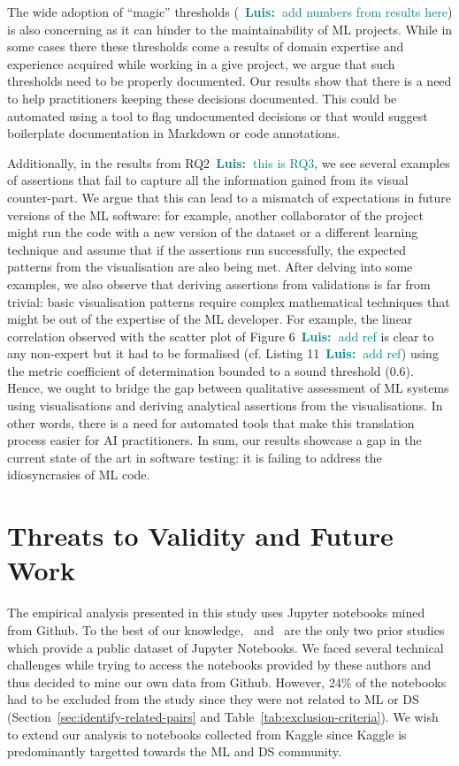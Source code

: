 \documentclass[conference]{IEEEtran}
\newcommand{\luis}[1]{\textcolor{teal}{\ding{46}~\textbf{Luis:~}#1}}
\begin{document}
The wide adoption of ``magic'' thresholds (\luis{add numbers from results here}) is also concerning as it can hinder to the maintainability of ML projects. While in some cases there these thresholds come a results of domain expertise and experience acquired while working in a give project, we argue that such thresholds need to be properly documented. Our results show that there is a need to help practitioners keeping these decisions documented. This could be automated using a tool to flag undocumented decisions or that would suggest boilerplate documentation in Markdown or code annotations.

Additionally, in the results from RQ2\luis{this is RQ3}, we see several examples of assertions that fail to capture all the information gained from its visual counter-part. We argue that this can lead to a mismatch of expectations in future versions of the ML software: for example, another collaborator of the project might run the code with a new version of the dataset or a different learning technique and assume that if the assertions run successfully, the expected patterns from the visualisation are also being met. After delving into some examples, we also observe that deriving assertions from validations is far from trivial: basic visualisation patterns require complex mathematical techniques that might be out of the expertise of the ML developer. For example, the linear correlation observed with the scatter plot of Figure 6\luis{add ref} is clear to any non-expert but it had to be formalised (cf. Listing 11\luis{add ref}) using the metric coefficient of determination bounded to a sound threshold (0.6). Hence, we ought to bridge the gap between qualitative assessment of ML systems using visualisations and deriving analytical assertions from the visualisations. In other words, there is a need for automated tools that make this translation process easier for AI practitioners. In sum, our results showcase a gap in the current state of the art in software testing: it is failing to address the idiosyncrasies of ML code.

\section{Threats to Validity and Future Work}\label{sec:threats}

The empirical analysis presented in this study uses Jupyter notebooks mined from Github. To the best of our knowledge,~\cite{pimentel2019large} and~\cite{quaranta2021kgtorrent} are the only two prior studies which provide a public dataset of Jupyter Notebooks. We faced several technical challenges while trying to access the notebooks provided by these authors and thus decided to mine our own data from Github. However, 24\% of the notebooks had to be excluded from the study since they were not related to ML or DS (Section~\ref{sec:identify-related-pairs} and Table~\ref{tab:exclusion-criteria}). We wish to extend our analysis to notebooks collected from Kaggle since Kaggle is predominantly targetted towards the ML and DS community.
\end{document}

